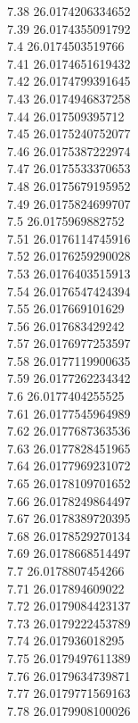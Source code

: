 {7.38	26.0174206334652\\
7.39	26.0174355091792\\
7.4	26.0174503519766\\
7.41	26.0174651619432\\
7.42	26.0174799391645\\
7.43	26.0174946837258\\
7.44	26.017509395712\\
7.45	26.0175240752077\\
7.46	26.0175387222974\\
7.47	26.0175533370653\\
7.48	26.0175679195952\\
7.49	26.0175824699707\\
7.5	26.0175969882752\\
7.51	26.0176114745916\\
7.52	26.0176259290028\\
7.53	26.0176403515913\\
7.54	26.0176547424394\\
7.55	26.017669101629\\
7.56	26.017683429242\\
7.57	26.0176977253597\\
7.58	26.0177119900635\\
7.59	26.0177262234342\\
7.6	26.0177404255525\\
7.61	26.0177545964989\\
7.62	26.0177687363536\\
7.63	26.0177828451965\\
7.64	26.0177969231072\\
7.65	26.0178109701652\\
7.66	26.0178249864497\\
7.67	26.0178389720395\\
7.68	26.0178529270134\\
7.69	26.0178668514497\\
7.7	26.0178807454266\\
7.71	26.017894609022\\
7.72	26.0179084423137\\
7.73	26.0179222453789\\
7.74	26.017936018295\\
7.75	26.0179497611389\\
7.76	26.0179634739871\\
7.77	26.0179771569163\\
7.78	26.0179908100026\\
}
